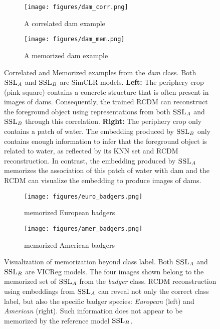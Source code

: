 \begin{figure*}[t!]
     \centering
     \begin{subfigure}[b]{0.49\textwidth}
         \centering
         \texttt{[image: figures/dam\_corr.png]}
         \caption{A correlated dam example}
         \label{fig:dam correlated}
     \end{subfigure}
     \hfill
     \begin{subfigure}[b]{0.49\textwidth}
         \centering
         \texttt{[image: figures/dam\_mem.png]}
         \caption{A memorized dam example}
         \label{fig:dam memorized}
     \end{subfigure}
\caption[Correlated and Memorized examples from the \emph{dam} class.]{
Correlated and Memorized examples from the \emph{dam} class. Both $\textsc{SSL}_A$ and $\textsc{SSL}_B$ are SimCLR models.
\textbf{Left:} The periphery crop (pink square) contains a concrete structure that is often present in images of dams. Consequently, the trained RCDM can reconstruct the foreground object using representations from both $\textsc{SSL}_A$ and $\textsc{SSL}_B$ through this correlation.
\textbf{Right:} The periphery crop only contains a patch of water. The embedding produced by $\textsc{SSL}_B$ only contains enough information to infer that the foreground object is related to water, as reflected by its KNN set and RCDM reconstruction. In contrast, the embedding produced by $\textsc{SSL}_A$ memorizes the association of this patch of water with dam and the RCDM can visualize the embedding to produce images of dams.
}
\label{fig:mem v corr dam}
\end{figure*}


\begin{figure}[t!]
     \centering
     \begin{subfigure}[b]{0.49\textwidth}
         \centering
         \texttt{[image: figures/euro\_badgers.png]}
         \caption{memorized European badgers}
         \label{fig:euro badgers}
     \end{subfigure}
     \hfill
     \begin{subfigure}[b]{0.49\textwidth}
         \centering
         \texttt{[image: figures/amer\_badgers.png]}
         \caption{memorized American badgers}
         \label{fig:amer badgers}
     \end{subfigure}
\caption[Visualization of \dejavu memorization beyond class label.]{
Visualization of \dejavu memorization beyond class label. Both $\textsc{SSL}_A$ and $\textsc{SSL}_B$ are VICReg models. 
The four images shown belong to the memorized set of $\textsc{SSL}_A$ from the \emph{badger} class. RCDM reconstruction using embeddings from $\textsc{SSL}_A$ can reveal not only the correct class label, but also the specific badger species: \emph{European} (left) and \emph{American} (right). Such information does not appear to be memorized by the reference model $\textsc{SSL}_B$.
} 
\label{fig:in class badger}
\end{figure}



